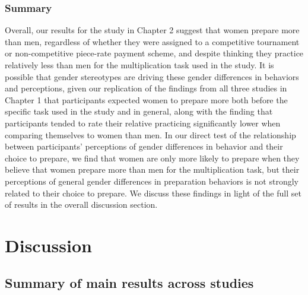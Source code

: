 \documentclass[a4paper, nobind]{templates/ociamthesis}
\begin{document}
\hypertarget{summary-3}{%
\subsection{Summary}\label{summary-3}}

Overall, our results for the study in Chapter 2 suggest that women prepare more than men, regardless of whether they were assigned to a competitive tournament or non-competitive piece-rate payment scheme, and despite thinking they practice relatively less than men for the multiplication task used in the study. It is possible that gender stereotypes are driving these gender differences in behaviors and perceptions, given our replication of the findings from all three studies in Chapter 1 that participants expected women to prepare more both before the specific task used in the study and in general, along with the finding that participants tended to rate their relative practicing significantly lower when comparing themselves to women than men. In our direct test of the relationship between participants' perceptions of gender differences in behavior and their choice to prepare, we find that women are only more likely to prepare when they believe that women prepare more than men for the multiplication task, but their perceptions of general gender differences in preparation behaviors is not strongly related to their choice to prepare. We discuss these findings in light of the full set of results in the overall discussion section.

\hypertarget{discussion-4}{%
\chapter*{Discussion}\label{discussion-4}}

\adjustmtc
{}

\hypertarget{summary-of-main-results-across-studies}{%
\section{Summary of main results across studies}\label{summary-of-main-results-across-studies}}
\end{document}
